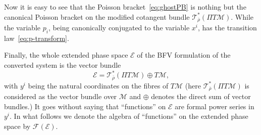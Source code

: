 \documentclass[a4paper,11pt,oneside]{amsart}
\theoremstyle{plain}
\numberwithin{equation}{section} %
\numberwithin{figure}{section} %
\def\bar{\overline}
\newcommand{\formal}[1]{{{\mathcal F}}{(#1)}}             %
\def\modbar{{\mathcal T}^*_{\bar\rho}}
\def\manM{{\mathcal M}}
\def\E{{ \mathcal E}}
\begin{document}
\noindent
Now it is easy to see that the Poisson bracket~\eqref{eq:ghostPB}
is nothing but the canonical Poisson bracket on the modified
cotangent bundle $\modbar(\Pi T \manM)$.  While the variable $p_i$,
being canonically conjugated to the variable $x^i$,
has the transition law~\eqref{eq:p-transform}.

\noindent
Finally, the whole extended phase space $\E$ of the BFV formulation
of the converted system is the vector bundle
\begin{equation}
\label{eq:E}
\E=\modbar(\Pi T \manM)\oplus T\manM,
\end{equation}
with $y^i$ being the natural coordinates on the fibres of $T
\manM$ (here $\modbar(\Pi T \manM)$ is considered as the vector bundle over
$\manM$ and $\oplus$ denotes the direct sum of vector bundles.) It
goes without saying that ``functions'' on $\E$ are formal power
series in $y^i$.  In what follows we denote the
algebra of ``functions'' on the extended phase space
by $\formal{\E}$.
\end{document}
